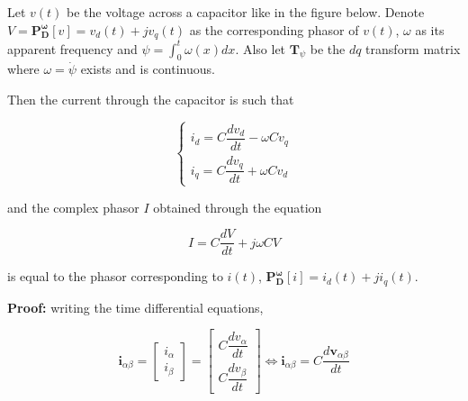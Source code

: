 \begin{theorem}\label{theo:1p_capacitive_conductance} %
Let $v(t)$ be the voltage across a capacitor like in the figure below. Denote $V =\mathbf{P_D^{\omega}} \left[v\right] = v_d\left(t\right) + jv_q\left(t\right)$ as the corresponding phasor of $v(t)$, $\omega$ as its apparent frequency and $\psi = \int_{0}^{t} \omega(x)dx$. Also let $\mathbf{T}_\psi$ be the $dq$ transform matrix where $\omega = \dot{\psi}$ exists and is continuous.

\begin{center}
\end{center}

	Then the current through the capacitor is such that

\begin{equation}
\left\{\begin{array}{l}
        i_d = C\dfrac{dv_d}{dt} - \omega C v_q \\[5mm]
        i_q = C\dfrac{dv_q}{dt} + \omega C v_d
\end{array}\right.
\end{equation}

	\noindent and the complex phasor $I$ obtained through the equation

\begin{equation} I = C\dfrac{dV}{dt} + j\omega C V \end{equation}

	is equal to the phasor corresponding to $i(t)$, $\mathbf{P_D^{\omega}}\left[i\right] = i_d\left(t\right) + ji_q\left(t\right)$.

\end{theorem}
\textbf{Proof:} writing the time differential equations,

\begin{equation} \mathbf{i}_{\alpha\beta} = 
\left[\begin{array}{c} i_\alpha \\ i_\beta \end{array}\right] = 
\left[\begin{array}{c} C\dfrac{dv_\alpha}{dt} \\[5mm] C\dfrac{dv_\beta}{dt} \end{array}\right] \Leftrightarrow
 \mathbf{i}_{\alpha\beta} = C\dfrac{d\mathbf{v}_{\alpha\beta}}{dt} \end{equation}

